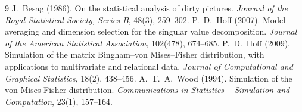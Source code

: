 \documentclass[11pt]{article}
\begin{document}
\begin{thebibliography}{9}
 J.~Besag (1986). On the statistical analysis of dirty pictures.
  \emph{Journal of the Royal Statistical Society, Series B}, 48(3), 259--302.
 P.~D.~Hoff (2007). Model averaging and dimension selection for the singular value decomposition.
  \emph{Journal of the American Statistical Association}, 102(478), 674--685.
 P.~D.~Hoff (2009). Simulation of the matrix Bingham--von Mises--Fisher distribution, with
  applications to multivariate and relational data. \emph{Journal of Computational and Graphical Statistics}, 18(2), 438--456.
 A.~T.~A.~Wood (1994). Simulation of the von Mises Fisher distribution.
  \emph{Communications in Statistics -- Simulation and Computation}, 23(1), 157--164.
\end{thebibliography}
\end{document}
